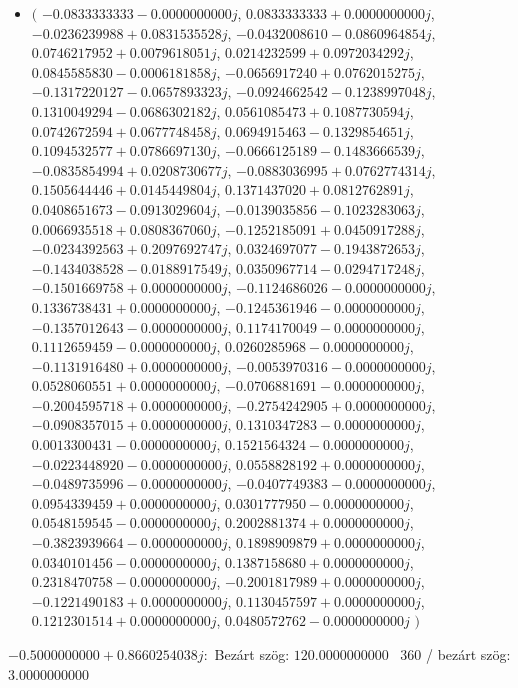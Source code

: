 \documentclass[14pt,a4paper]{article}
\begin{document}
\begin{itemize}
\item
$\big($
$-0.0833333333-0.0000000000j$, $0.0833333333+0.0000000000j$, $-0.0236239988+0.0831535528j$, $-0.0432008610-0.0860964854j$, $0.0746217952+0.0079618051j$, $0.0214232599+0.0972034292j$, $0.0845585830-0.0006181858j$, $-0.0656917240+0.0762015275j$, $-0.1317220127-0.0657893323j$, $-0.0924662542-0.1238997048j$, $0.1310049294-0.0686302182j$, $0.0561085473+0.1087730594j$, $0.0742672594+0.0677748458j$, $0.0694915463-0.1329854651j$, $0.1094532577+0.0786697130j$, $-0.0666125189-0.1483666539j$, $-0.0835854994+0.0208730677j$, $-0.0883036995+0.0762774314j$, $0.1505644446+0.0145449804j$, $0.1371437020+0.0812762891j$, $0.0408651673-0.0913029604j$, $-0.0139035856-0.1023283063j$, $0.0066935518+0.0808367060j$, $-0.1252185091+0.0450917288j$, $-0.0234392563+0.2097692747j$, $0.0324697077-0.1943872653j$, $-0.1434038528-0.0188917549j$, $0.0350967714-0.0294717248j$, $-0.1501669758+0.0000000000j$, $-0.1124686026-0.0000000000j$, $0.1336738431+0.0000000000j$, $-0.1245361946-0.0000000000j$, $-0.1357012643-0.0000000000j$, $0.1174170049-0.0000000000j$, $0.1112659459-0.0000000000j$, $0.0260285968-0.0000000000j$, $-0.1131916480+0.0000000000j$, $-0.0053970316-0.0000000000j$, $0.0528060551+0.0000000000j$, $-0.0706881691-0.0000000000j$, $-0.2004595718+0.0000000000j$, $-0.2754242905+0.0000000000j$, $-0.0908357015+0.0000000000j$, $0.1310347283-0.0000000000j$, $0.0013300431-0.0000000000j$, $0.1521564324-0.0000000000j$, $-0.0223448920-0.0000000000j$, $0.0558828192+0.0000000000j$, $-0.0489735996-0.0000000000j$, $-0.0407749383-0.0000000000j$, $0.0954339459+0.0000000000j$, $0.0301777950-0.0000000000j$, $0.0548159545-0.0000000000j$, $0.2002881374+0.0000000000j$, $-0.3823939664-0.0000000000j$, $0.1898909879+0.0000000000j$, $0.0340101456-0.0000000000j$, $0.1387158680+0.0000000000j$, $0.2318470758-0.0000000000j$, $-0.2001817989+0.0000000000j$, $-0.1221490183+0.0000000000j$, $0.1130457597+0.0000000000j$, $0.1212301514+0.0000000000j$, $0.0480572762-0.0000000000j$
$\big)$
\end{itemize}
$-0.5000000000+0.8660254038j$:\
Bezárt szög: $120.0000000000$ \
360 / bezárt szög: $3.0000000000$\
\end{document}
